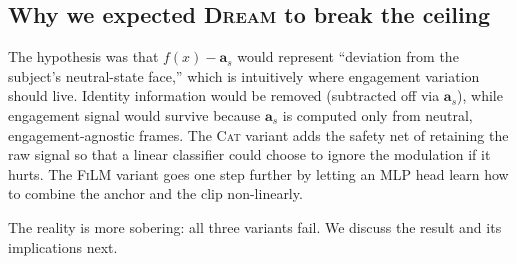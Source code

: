 \subsection{Why we expected \textsc{Dream} to break the ceiling}

The hypothesis was that $f(x) - \mathbf{a}_s$ would represent
``deviation from the subject's neutral-state face,'' which is
intuitively where engagement variation should live. Identity
information would be removed (subtracted off via $\mathbf{a}_s$),
while engagement signal would survive because $\mathbf{a}_s$ is
computed only from neutral, engagement-agnostic frames. The
\textsc{Cat} variant adds the safety net of retaining the raw
signal so that a linear classifier could choose to ignore the
modulation if it hurts. The \textsc{FiLM} variant goes one step
further by letting an MLP head learn how to combine the anchor and
the clip non-linearly.

The reality is more sobering: all three variants fail. We discuss
the result and its implications next.

